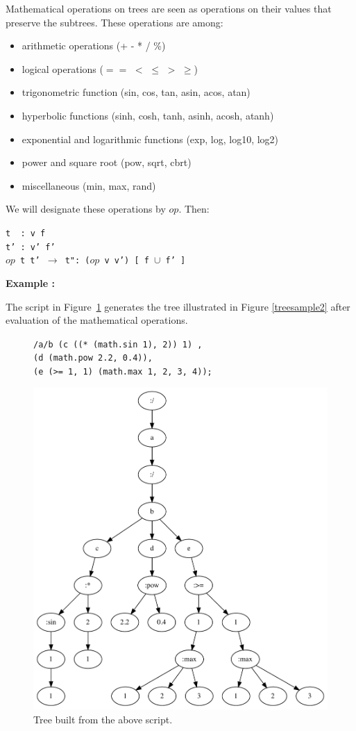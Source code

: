 \documentclass{article}
\newcommand{\exemple}	{\vspace*{1mm}\hspace*{-4mm}\textbf{Example :}}
\newcommand{\code}	[2][0.9]		{\vspace{0mm}\begin{center}\colorbox{mygrey}{
							\begin{minipage}[t]{#1\columnwidth} 
							{\small \texttt{#2}}
							\end{minipage}}\end{center}}
\newcommand{\op}	[1]		{\vspace{0mm}\begin{center}\colorbox{mygrey}{
							\begin{minipage}[t]{0.9\columnwidth} 
							{\small \texttt{#1}}
							\end{minipage}}\end{center}}
\newcommand{\binop}		{$op$}
\newcommand{\ulb}		{\hspace*{4mm}}
\begin{document}
Mathematical operations on trees are seen as operations on their values that preserve the subtrees. These operations are among:
\begin{itemize}
 \setlength\itemsep{0.0em}
\item arithmetic operations (+ - * / \%)
\item logical operations ($==$ $<$ $\leq$ $>$ $\geq$)
\item trigonometric function (sin, cos, tan, asin, acos, atan)
\item hyperbolic functions (sinh, cosh, tanh, asinh, acosh, atanh)
\item exponential and logarithmic functions (exp, log, log10, log2)
\item power and square root (pow, sqrt, cbrt)
\item miscellaneous  (min, max, rand)
\end{itemize}

We will designate these operations by \binop. Then:
\op{t\ \ :  v f\\
t' : v' f'\\
\binop\ t t'  $\to$  t":  (\binop\ v v') [ f $\cup$ f' ]  
}

\exemple

The script in Figure~\ref{parsesample2} generates the tree illustrated in Figure \ref{treesample2} after evaluation of the mathematical operations.

\begin{figure}[htbp]
\code{/a/b 	(c ((* (math.sin 1), 2)) 1) ,\\
\ulb		(d (math.pow 2.2, 0.4)),\\
\ulb		(e (>= 1, 1) (math.max 1, 2, 3, 4));}
\begin{center}
\includegraphics[width=1.\columnwidth]{tree/sample3}
\caption{Tree built from the above script.}
\label{parsesample2}
\end{center}
\end{figure}
\end{document}
